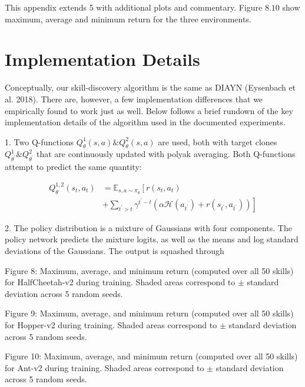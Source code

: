 This appendix extends 5 with additional plots and commentary. Figure $8.10$ show maximum, average and minimum return for the three environments.

\section{Implementation Details}

Conceptually, our skill-discovery algorithm is the same as DIAYN (Eysenbach et al. 2018). There are, however, a few implementation differences that we empirically found to work just as well. Below follows a brief rundown of the key implementation details of the algorithm used in the documented experiments.

1. Two Q-functions $Q_{\theta}^{1}(s, a) \& Q_{\theta}^{2}(s, a)$ are used, both with target clones $Q_{\theta^{\prime}}^{1} \& Q_{\theta^{\prime}}^{2}$ that are continuously updated with polyak averaging. Both Q-functions attempt to predict the same quantity:

$$
\begin{aligned}
Q_{\theta}^{1,2}\left(s_{t}, a_{t}\right) &=\mathbb{E}_{s, a \sim \pi_{\theta}}\left[r\left(s_{t}, a_{t}\right)\right.\\
&\left.+\sum_{t^{\prime}>t} \gamma^{t^{\prime}-t}\left(\alpha \mathcal{H}\left(a_{t^{\prime}}\right)+r\left(s_{t^{\prime}}, a_{t^{\prime}}\right)\right)\right]
\end{aligned}
$$

2. The policy distribution is a mixture of Gaussians with four components. The policy network predicts the mixture logits, as well as the means and log standard deviations of the Gaussians. The output is squashed through 

Figure 8: Maximum, average, and minimum return (computed over all 50 skills) for HalfCheetah-v2 during training. Shaded areas correspond to $\pm$ standard deviation across 5 random seeds.

Figure 9: Maximum, average, and minimum return (computed over all 50 skills) for Hopper-v2 during training. Shaded areas correspond to $\pm$ standard deviation across 5 random seeds.

Figure 10: Maximum, average, and minimum return (computed over all 50 skills) for Ant-v2 during training. Shaded areas correspond to $\pm$ standard deviation across 5 random seeds.